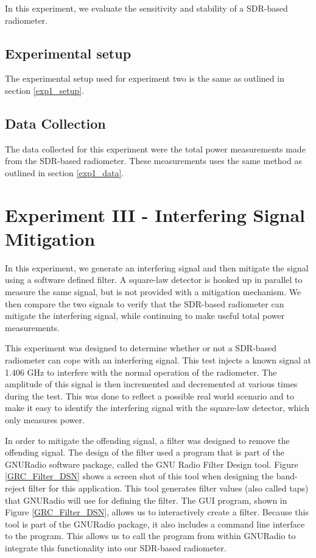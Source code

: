 In this experiment, we evaluate the sensitivity and stability of a SDR-based radiometer.    

\subsection{Experimental setup} \label{exp2_setup}
The experimental setup used for experiment two is the same as outlined in section \ref{exp1_setup}.  

\subsection{Data Collection}
The data collected for this experiment were the total power measurements made from the SDR-based radiometer.  These measurements uses the same method as outlined in section \ref{exp1_data}.

\section{Experiment III - Interfering Signal Mitigation}\label{Exp3}

In this experiment, we generate an interfering signal and then mitigate the signal using a software defined filter.  A square-law detector is hooked up in parallel to measure the same signal, but is not provided with a mitigation mechanism.  We then compare the two signals to verify that the SDR-based radiometer can mitigate the interfering signal, while continuing to make useful total power measurements.

This experiment was designed to determine whether or not a SDR-based radiometer can cope with an interfering signal.  This test injects a known signal at 1.406 GHz to interfere with the normal operation of the radiometer.  The amplitude of this signal is then incremented and decremented at various times during the test.  This was done to reflect a possible real world scenario and to make it easy to identify the interfering signal with the square-law detector, which only measures power.  

In order to mitigate the offending signal, a filter was designed to remove the offending signal.  The design of the filter used a program that is part of the GNURadio software package, called the GNU Radio Filter Design tool.  Figure \ref{GRC_Filter_DSN} shows a screen shot of this tool when designing the band-reject filter for this application.  This tool generates filter values (also called taps) that GNURadio will use for defining the filter.  The GUI program, shown in Figure \ref{GRC_Filter_DSN}, allows us to interactively create a filter.  Because this tool is part of the GNURadio package, it also includes a command line interface to the program.  This allows us to call the program from within GNURadio to integrate this functionality into our SDR-based radiometer.  


